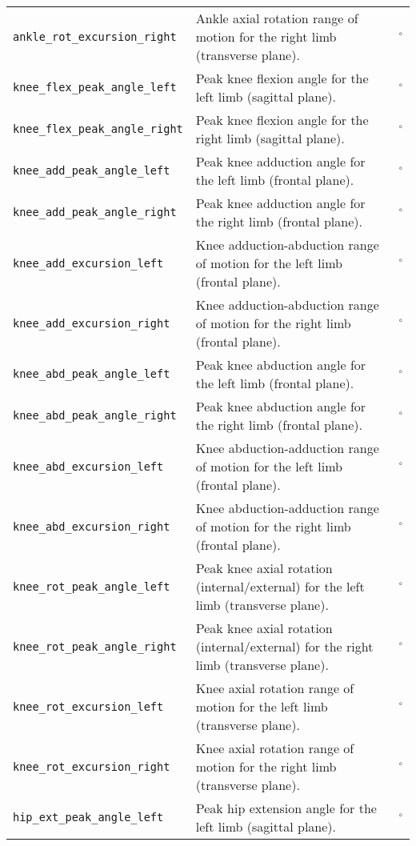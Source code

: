 \begin{longtable}{@{}l p{} l@{}}
    \texttt{ankle\_rot\_excursion\_right} & Ankle axial rotation range of motion for the right limb (transverse plane). & $^\circ$ \\
    \texttt{knee\_flex\_peak\_angle\_left} & Peak knee flexion angle for the left limb (sagittal plane). & $^\circ$ \\
    \texttt{knee\_flex\_peak\_angle\_right} & Peak knee flexion angle for the right limb (sagittal plane). & $^\circ$ \\
    \texttt{knee\_add\_peak\_angle\_left} & Peak knee adduction angle for the left limb (frontal plane). & $^\circ$ \\
    \texttt{knee\_add\_peak\_angle\_right} & Peak knee adduction angle for the right limb (frontal plane). & $^\circ$ \\
    \texttt{knee\_add\_excursion\_left} & Knee adduction-abduction range of motion for the left limb (frontal plane). & $^\circ$ \\
    \texttt{knee\_add\_excursion\_right} & Knee adduction-abduction range of motion for the right limb (frontal plane). & $^\circ$ \\
    \texttt{knee\_abd\_peak\_angle\_left} & Peak knee abduction angle for the left limb (frontal plane). & $^\circ$ \\
    \texttt{knee\_abd\_peak\_angle\_right} & Peak knee abduction angle for the right limb (frontal plane). & $^\circ$ \\
    \texttt{knee\_abd\_excursion\_left} & Knee abduction-adduction range of motion for the left limb (frontal plane). & $^\circ$ \\
    \texttt{knee\_abd\_excursion\_right} & Knee abduction-adduction range of motion for the right limb (frontal plane). & $^\circ$ \\
    \texttt{knee\_rot\_peak\_angle\_left} & Peak knee axial rotation (internal/external) for the left limb (transverse plane). & $^\circ$ \\
    \texttt{knee\_rot\_peak\_angle\_right} & Peak knee axial rotation (internal/external) for the right limb (transverse plane). & $^\circ$ \\
    \texttt{knee\_rot\_excursion\_left} & Knee axial rotation range of motion for the left limb (transverse plane). & $^\circ$ \\
    \texttt{knee\_rot\_excursion\_right} & Knee axial rotation range of motion for the right limb (transverse plane). & $^\circ$ \\
    \texttt{hip\_ext\_peak\_angle\_left} & Peak hip extension angle for the left limb (sagittal plane). & $^\circ$ \\

\end{longtable}
